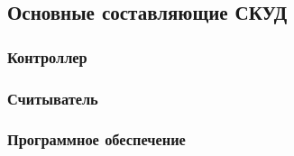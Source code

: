 \subsection{Основные составляющие СКУД}

\subsubsection{Контроллер}

\subsubsection{Считыватель}

\subsubsection{Программное обеспечение}
